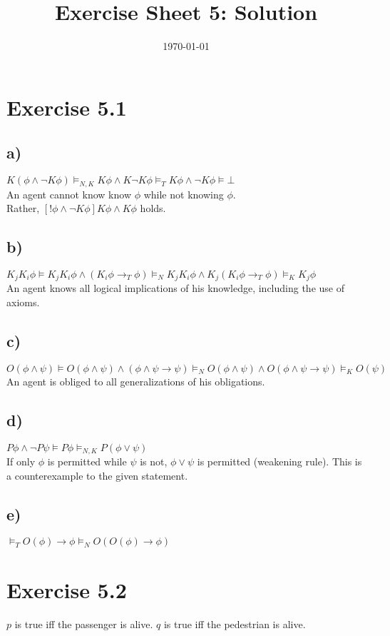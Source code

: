 \documentclass[a4paper]{article}
\begin{document}
\title{Exercise Sheet 5: Solution}
\author{}
\date{\today}

\section{Exercise 5.1}
\subsection{a)}
$
K(\phi \land \lnot K \phi)
\models_{N, K} K \phi \land K \lnot K \phi
\models_T K \phi \land \lnot K \phi
\models \bot
$\\
An agent cannot know know $\phi$ while not knowing $\phi$.\\
Rather, $[!\phi \land \lnot K\phi]K\phi \land K\phi$ holds.

\subsection{b)}
$
K_j K_i \phi
\models K_j K_i \phi \land (K_i \phi \rightarrow_T \phi)
\models_N K_j K_i \phi \land K_j(K_i \phi \rightarrow_T \phi)
\models_K K_j \phi
$\\
An agent knows all logical implications of his knowledge, including the use of axioms. 

\subsection{c)}
$
O(\phi \land \psi)
\models O(\phi \land \psi) \land (\phi \land \psi \rightarrow \psi)
\models_N O(\phi \land \psi) \land O(\phi \land \psi \rightarrow \psi)
\models_K O(\psi)
$\\
An agent is obliged to all generalizations of his obligations.

\subsection{d)}
$
P\phi \land \lnot P\psi
\models P\phi
\models_{N, K} P(\phi \lor \psi)
$\\
If only $\phi$ is permitted while $\psi$ is not, $\phi \lor \psi$ is permitted (weakening rule). This is a counterexample to the given statement.
\subsection{e)}
$
\models_T O(\phi) \rightarrow \phi
\models_N O(O(\phi) \rightarrow \phi)
$

\section{Exercise 5.2}
$p$ is true iff the passenger is alive. $q$ is true iff the pedestrian is alive.\\
\end{document}
